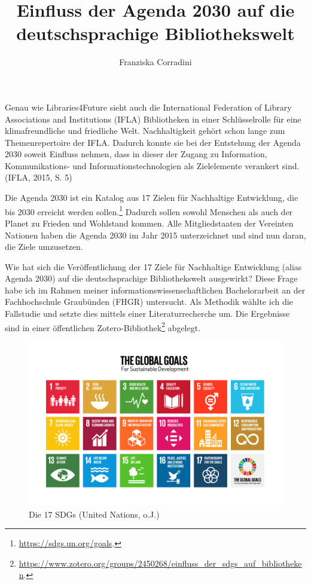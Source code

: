 \documentclass[a4paper,
fontsize=11pt,
oneside,
numbers=noperiodatend,
parskip=half-,
bibliography=totoc,
final
]{scrartcl}
\title{\LARGE{Einfluss der Agenda 2030 auf die deutschsprachige Bibliothekswelt}}%
\author{Franziska Corradini} %
\date{}
\begin{document}
\maketitle
\thispagestyle{fancyplain} 


Genau wie Libraries4Future sieht auch die International Federation of
Library Associations and Institutions (IFLA) Bibliotheken in einer
Schlüsselrolle für eine klimafreundliche und friedliche Welt.
Nachhaltigkeit gehört schon lange zum Themenrepertoire der IFLA. Dadurch
konnte sie bei der Entstehung der Agenda 2030 soweit Einfluss nehmen,
dass in dieser der Zugang zu Information, Kommunikations- und
Informationstechnologien als Zielelemente verankert sind. (IFLA, 2015,
S. 5)

Die Agenda 2030 ist ein Katalog aus 17 Zielen für Nachhaltige
Entwicklung, die bis 2030 erreicht werden sollen.\footnote{\url{https://sdgs.un.org/goals}.}
Dadurch sollen sowohl Menschen als auch der Planet zu Frieden und
Wohlstand kommen. Alle Mitgliedstaaten der Vereinten Nationen haben die
Agenda 2030 im Jahr 2015 unterzeichnet und sind nun daran, die Ziele
umzusetzen.

Wie hat sich die Veröffentlichung der 17 Ziele für Nachhaltige
Entwicklung (alias Agenda 2030) auf die deutschsprachige Bibliothekswelt
ausgewirkt? Diese Frage habe ich im Rahmen meiner
informationswissenschaftlichen Bachelorarbeit an der Fachhochschule
Graubünden (FHGR) untersucht. Als Methodik wählte ich die Fallstudie und
setzte dies mittels einer Literaturrecherche um. Die Ergebnisse sind in
einer öffentlichen Zotero-Bibliothek\footnote{\url{https://www.zotero.org/groups/2450268/einfluss_der_sdgs_auf_bibliotheken}.}
abgelegt.

\begin{figure}
\centering
\includegraphics{img/sgd_17.png}
\caption{Die 17 SDGs (United Nations, o.J.)}
\end{figure}
\end{document}
